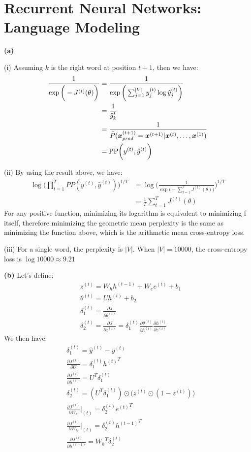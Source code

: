 \documentclass[10pt, a4paper]{ctexart}
\begin{document}
\section{Recurrent Neural Networks: Language Modeling}
{\bf{(a)}}\par
{\hspace{10pt}}(i) Assuming $k$ is the right word at position $t+1$, then we have:
\begin{align*}
    \frac{1}{\exp\bigg(-J^{(t)}(\theta)\bigg)}&=\frac{1}{\exp\bigg(\sum_{j=1}^{|V|}y_j^{(t)}\log \hat{y}_j^{(t)}\bigg)}\\
    &=\frac{1}{\hat{y}_k^{t}}\\
    &=\frac{1}{\bar{P}({\bm{x}}_{pred}^{(t+1)}={\bm{x}}^{(t+1)}|{\bm{x}}^{(t)},\dots,{\bm{x}}^{(1)})}\\
    &={\rm{PP}}\bigg(y^{(t)},\hat{y}^{(t)}\bigg)\\
\end{align*}\par
{\hspace{10pt}}(ii) By using the result above, we have:
\begin{align*}
    \log\bigg(\prod_{t=1}^TPP(y^{(t)},\hat{y}^{(t)})\bigg)^{1/T}&=\log\Bigg(\frac{1}{\exp\big(-\sum_{t=1}^TJ^{(t)}(\theta)\big)}\Bigg)^{1/T}\\
    &=\frac{1}{T}\sum_{t=1}^TJ^{(t)}(\theta)
\end{align*}
For any positive function, minimizing its logarithm is equivalent to minimizing f itself, therefore minimizing the geometric mean perplexity is the same as minimizing the function above, which is the arithmetic mean cross-entropy loss.\par
{\hspace{10pt}}(iii) For a single word, the perplexity is $|V|$. When $|V|=10000$, the cross-entropy loss is $\log 10000\approx 9.21$\par
{\bf{(b)}} Let's define:
\begin{align*}
    &z^{(t)} = W_hh^{(t-1)}+W_ee^{(t)}+b_1\\
    &\theta^{(t)}=Uh^{(t)}+b_2\\
    &\delta_1^{(t)}=\frac{\partial J}{\partial \theta^{(t)}}\\
    &\delta_2^{(t)}=\frac{\partial J}{\partial z^{(t)}}=\delta_1^{(t)}\frac{\partial \theta^{(t)}}{\partial h^{(t)}}\frac{\partial h^{(t)}}{\partial z^{(t)}}
\end{align*}
We then have:
\begin{align*}
    &\delta_1^{(t)}=\hat{y}^{(t)}-y^{(t)}\\
    &\frac{\partial J^{(t)}}{\partial U}=\delta_1^{(t)}{h^{(t)}}^T\\
    &\frac{\partial J^{(t)}}{\partial h^{(t)}}=U^T\delta_1^{(t)}\\
    &\delta_2^{(t)}=(U^T\delta_1^{(t)})\odot\big(z^{(t)}\odot(1-z^{(t)})\big)\\
    &\frac{\partial J^{(t)}}{\partial W_e}\vert_{(t)}=\delta_2^{(t)}{e^{(t)}}^T\\
    &\frac{\partial J^{(t)}}{\partial W_h}\vert_{(t)}=\delta_2^{(t)}{h^{(t-1)}}^T\\
    &\frac{\partial J^{(t)}}{\partial h^{(t-1)}}={W_h}^T\delta_2^{(t)}
\end{align*}\par
\end{document}
